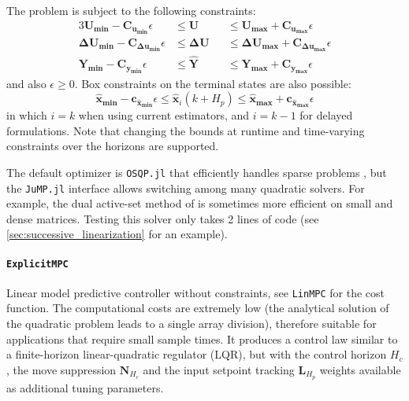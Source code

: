 The problem is subject to the following constraints:
\begin{alignat}{3}
    \mathbf{U_{min}  - C_{u_{min}}}  \epsilon &\le \mathbf{U}  &&\le \mathbf{U_{max}  + C_{u_{max}}}  \epsilon \\
    \mathbf{ΔU_{min} - C_{Δu_{min}}} \epsilon &\le \mathbf{ΔU} &&\le \mathbf{ΔU_{max} + C_{Δu_{max}}} \epsilon \\
    \mathbf{Y_{min}  - C_{y_{min}}}  \epsilon &\le \mathbf{\hat{Y}} &&\le \mathbf{Y_{max}  + C_{y_{max}}}  \epsilon
\end{alignat}
and also $\epsilon \ge 0$. Box constraints on the terminal states are also possible: 
\begin{equation}
\mathbf{\hat{x}_{min}} {-} \mathbf{c_{\hat{x}_{min}}}\epsilon \le \mathbf{\hat{x}}_{i}(k{+}H_p) \le \mathbf{\hat{x}_{max}} + \mathbf{c_{\hat{x}_{max}}}\epsilon
\end{equation}
in which $i=k$ when using current estimators, and $i=k-1$ for delayed formulations. Note that changing the bounds at runtime and time-varying constraints over the horizons are supported.

The default optimizer is \texttt{OSQP.jl} that efficiently handles sparse problems \citep{osqp}, but the \texttt{JuMP.jl} interface allows switching among many quadratic solvers. For example, the dual active-set method of \citet{daqp} is sometimes more efficient on small and dense matrices. Testing this solver only takes 2 lines of code (see \cref{sec:successive_linearization} for an example).

\paragraph{\texttt{ExplicitMPC}}
Linear model predictive controller without constraints, see \texttt{LinMPC} for the cost function. The computational costs are extremely low (the analytical solution of the quadratic problem leads to a single array division), therefore suitable for applications that require small sample times. It produces a control law similar to a finite-horizon linear-quadratic regulator (LQR), but with the control horizon $H_c$, the move suppression $\mathbf{N}_{H_c}$ and the input setpoint tracking $\mathbf{L}_{H_p}$ weights available as additional tuning parameters.

